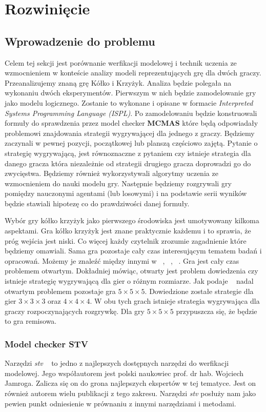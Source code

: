 
\chapter{Rozwinięcie}

\section{Wprowadzenie do problemu}
Celem tej sekcji jest porównanie werfikacji modelowej i technik uczenia ze wzmocnieniem w konteście analizy 
modeli reprezentujących grę dla dwóch graczy. Przeanalizujemy znaną grę Kółko i Krzyżyk. Analiza będzie polegała na wykonaniu dwóch eksperymentów. Pierwszym w nich będzie 
zamodelowanie gry jako modelu logicznego. Zostanie to wykonane i opisane w formacie \textit{ Interpreted Systems Programming Language
(ISPL)}. Po zamodelowaniu będzie konstruowali formuły do sprawdzenia przez model checker \textbf{MCMAS} które będą 
odpowiadały problemowi znajdowania strategii wygrywającej dla jednego z graczy. Będziemy zaczynali w pewnej pozycji,
początkowej lub planszą częściowo zajętą. Pytanie o strategię wygrywającą, jest równoznaczne z pytaniem 
czy istnieje strategia dla danego gracza która niezależnie od strategii drugiego gracza doprowadzi go do zwycięstwa.
Będziemy również wykorzystywali algorytmy uczenia ze wzmocnieniem do nauki modelu gry. Następnie będziemy rozgrywali 
gry pomiędzy nauczonymi agentami (lub losowymi) i na podstawie serii wyników będzie stawiali hipotezę co do prawdziwości 
danej formuły.

Wybór gry kółko krzyżyk jako pierwszego środowiska jest umotywowany kilkoma aspektami. Gra kółko krzyżyk 
jest znane praktycznie każdemu i to sprawia, że próg wejścia jest niski. Co więcej każdy czytelnik zrozumie 
zagadnienie które będziemy omawiali. Sama gra pozostaje cały czas interesującym tematem badań i opracowań.
Możemy je znaleźć między innymi w ~\cite{Deepa}, ~\cite{Dalffa2019-DALTLU}, ~\cite{Fogel}.
Gra jest cały czas problemem otwartym. Dokładniej mówiąc, otwarty jest problem dowiedzenia czy istnieje 
strategię wygrywającą dla gier o różnym rozmiarze. Jak podaje ~\cite{beck2008combinatorial} nadal otwartym problemem 
pozostaje gra $5 \times 5 \times 5$. Dowiedzione zostałe strategie dla gier $3\times 3 \times 3$ oraz 
$4 \times 4 \times 4$. W obu tych grach istnieje strategia wygrywająca dla graczy rozpoczynających rozgrywkę.
Dla gry $5 \times 5 \times 5$ przypuszcza się, że będzie to gra remisowa.
\subsection{Model checker STV}
Narzędzi \textit{stv} ~\cite{jamroga_stv} to jedno z najlepszych dostępnych narzędzi do werfikacji modelowej.
Jego współautorem jest polski naukowiec prof. dr hab. Wojciech Jamroga. Zalicza się on do grona najlepszych ekspertów w tej 
tematyce. Jest on również autorem wielu publikacji z tego zakresu. Narzędzi \textit{stv} posłuży nam jako pewien punkt 
odniesienie w prównaniu z innymi narzędziami i metodami.
